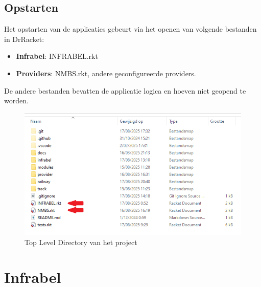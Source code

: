 \documentclass[a4paper, 11pt]{article}
\newcommand{\<}{\scriptsize\textless\normalsize}
\renewcommand{\>}{\scriptsize\textgreater\normalsize}
\begin{document}
\subsection{Opstarten} %
Het opstarten van de applicaties gebeurt via het openen van volgende bestanden in DrRacket:
\begin{itemize}
  \item \textbf{Infrabel}: INFRABEL.rkt
  \item \textbf{Providers}: NMBS.rkt, andere geconfigureerde providers.
\end{itemize}
De andere bestanden bevatten de applicatie logica en hoeven niet geopend te worden.\\
\begin{figure}[h]
	\begin{center}
		\includegraphics[scale=.60]{Bestanden/besturingssysteem-modeltreinen-tldir.png}
		\caption{Top Level Directory van het project}
	\end{center}
\end{figure}

\newpage
\section{Infrabel} %
\end{document}
